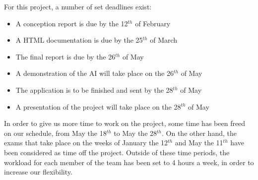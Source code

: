 For this project, a number of set deadlines exist:
\begin{itemize}
	\item A conception report is due by the 12$^{th}$  of February
	\item A HTML documentation is due by the 25$^{th}$ of March
	\item The final report  is due by the 26$^{th}$ of May
	\item A demonstration of the AI will take place on the 26$^{th}$ of May
	\item The application is to be finished and sent by the 28$^{th}$ of May
	\item A presentation of the project will take place on the 28$^{th}$ of May
\end{itemize}

In order to give us more time to work on the project, some time has been freed on our schedule, from May the 18$^{th}$ to May the 28$^{th}$.
On the other hand, the exams that take place on the weeks of January the 12$^{th}$ and May the 11$^{th}$ have been considered as time off the project. 
Outside of these time periods, the workload for each member of the team has been set to 4 hours a week, in order to increase our flexibility.